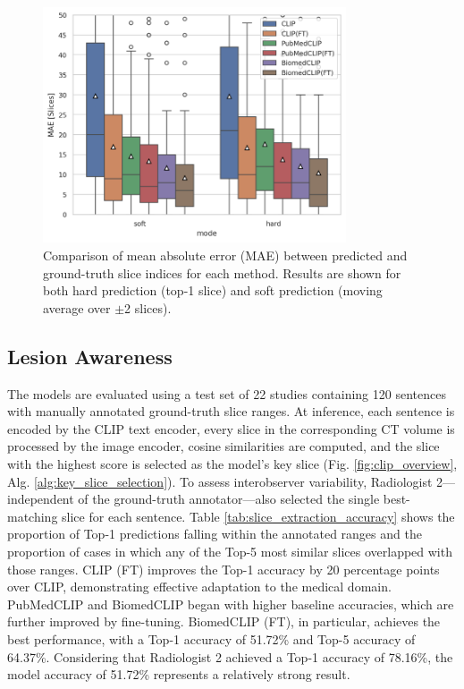 \documentclass[bioengineering,article,submit,pdftex,moreauthors]{Definitions/mdpi}
\begin{document}
\begin{figure}[ht]
  \centering
  \includegraphics[width=0.8\textwidth]{./figures/mae.png}
  \caption{
    Comparison of mean absolute error (MAE) between predicted and ground-truth slice indices for each method. 
    Results are shown for both hard prediction (top-1 slice) and soft prediction (moving average over $\pm$2 slices).
  }
  \label{fig:mae}
\end{figure}


\subsection{Lesion Awareness}\label{sec:lesion_aware}
The models are evaluated using a test set of 22 studies containing 120 sentences with manually annotated ground-truth slice ranges. 
At inference, each sentence is encoded by the CLIP text encoder, every slice in the corresponding CT volume is processed by the image encoder, cosine similarities are computed, and the slice with the highest score is selected as the model’s key slice (Fig. \ref{fig:clip_overview}, Alg. \ref{alg:key_slice_selection}). 
To assess interobserver variability, Radiologist 2—independent of the ground-truth annotator—also selected the single best-matching slice for each sentence.
Table \ref{tab:slice_extraction_accuracy} shows the proportion of Top-1 predictions falling within the annotated ranges and the proportion of cases in which any of the Top-5 most similar slices overlapped with those ranges. 
CLIP (FT) improves the Top-1 accuracy by 20 percentage points over CLIP, demonstrating effective adaptation to the medical domain.
PubMedCLIP and BiomedCLIP began with higher baseline accuracies, which are further improved by fine-tuning. 
BiomedCLIP (FT), in particular, achieves the best performance, with a Top-1 accuracy of 51.72\% and Top-5 accuracy of 64.37\%. 
Considering that Radiologist 2 achieved a Top-1 accuracy of 78.16\%, the model accuracy of 51.72\% represents a relatively strong result.
\end{document}
